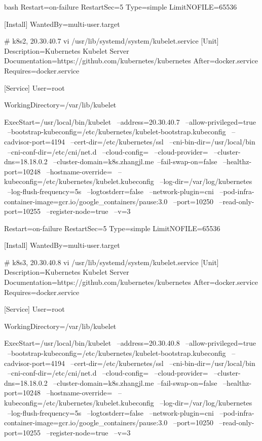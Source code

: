 \begin{outline}[enumerate]
\begin{code-block}{bash}
Restart=on-failure
RestartSec=5
Type=simple
LimitNOFILE=65536

[Install]
WantedBy=multi-user.target

# k8s2, 20.30.40.7
vi /usr/lib/systemd/system/kubelet.service
[Unit]
Description=Kubernetes Kubelet Server
Documentation=https://github.com/kubernetes/kubernetes
After=docker.service
Requires=docker.service

[Service]
User=root

WorkingDirectory=/var/lib/kubelet

ExecStart=/usr/local/bin/kubelet \
    --address=20.30.40.7 \
    --allow-privileged=true \
    --bootstrap-kubeconfig=/etc/kubernetes/kubelet-bootstrap.kubeconfig \
    --cadvisor-port=4194 \
    --cert-dir=/etc/kubernetes/ssl \
    --cni-bin-dir=/usr/local/bin \
    --cni-conf-dir=/etc/cni/net.d \
    --cloud-config= \
    --cloud-provider= \
    --cluster-dns=18.18.0.2 \
    --cluster-domain=k8s.zhangjl.me\
    --fail-swap-on=false \
    --healthz-port=10248 \
    --hostname-override= \
    --kubeconfig=/etc/kubernetes/kubelet.kubeconfig \
    --log-dir=/var/log/kubernetes \
    --log-flush-frequency=5s \
    --logtostderr=false \
    --network-plugin=cni \
    --pod-infra-container-image=gcr.io/google_containers/pause:3.0 \
    --port=10250 \
    --read-only-port=10255 \
    --register-node=true \
    --v=3

Restart=on-failure
RestartSec=5
Type=simple
LimitNOFILE=65536

[Install]
WantedBy=multi-user.target

# k8s3, 20.30.40.8
vi /usr/lib/systemd/system/kubelet.service
[Unit]
Description=Kubernetes Kubelet Server
Documentation=https://github.com/kubernetes/kubernetes
After=docker.service
Requires=docker.service

[Service]
User=root

WorkingDirectory=/var/lib/kubelet

ExecStart=/usr/local/bin/kubelet \
    --address=20.30.40.8 \
    --allow-privileged=true \
    --bootstrap-kubeconfig=/etc/kubernetes/kubelet-bootstrap.kubeconfig \
    --cadvisor-port=4194 \
    --cert-dir=/etc/kubernetes/ssl \
    --cni-bin-dir=/usr/local/bin \
    --cni-conf-dir=/etc/cni/net.d \
    --cloud-config= \
    --cloud-provider= \
    --cluster-dns=18.18.0.2 \
    --cluster-domain=k8s.zhangjl.me\
    --fail-swap-on=false \
    --healthz-port=10248 \
    --hostname-override= \
    --kubeconfig=/etc/kubernetes/kubelet.kubeconfig \
    --log-dir=/var/log/kubernetes \
    --log-flush-frequency=5s \
    --logtostderr=false \
    --network-plugin=cni \
    --pod-infra-container-image=gcr.io/google_containers/pause:3.0 \
    --port=10250 \
    --read-only-port=10255 \
    --register-node=true \
    --v=3


\end{code-block}
\end{outline}
